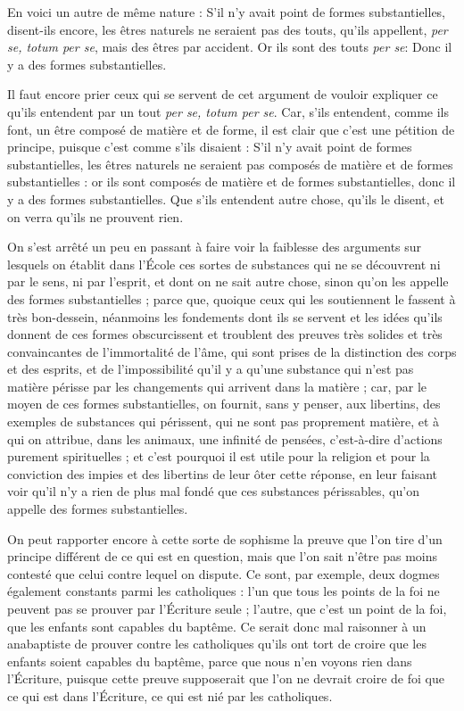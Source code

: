 En voici un autre de même nature : S'il n'y avait point de formes substantielles, disent-ils encore, les êtres naturels ne seraient pas des touts, qu'ils appellent, \emph{per se, totum per se}, mais des êtres par accident. Or ils sont des touts \emph{per se}: Donc il y a des formes substantielles.

Il faut encore prier ceux qui se servent de cet argument de vouloir expliquer ce qu'ils entendent par un tout \emph{per se, totum per se}. Car, s'ils entendent, comme ils font, un être composé de matière et de forme, il est clair que c'est une pétition de principe, puisque c'est comme s'ils disaient : S'il n'y avait point de formes substantielles, les êtres naturels ne seraient pas composés de matière et de formes substantielles : or ils sont composés de matière et de formes substantielles, donc il y a des formes substantielles. Que s'ils entendent autre chose, qu'ils le disent, et on verra qu'ils ne prouvent rien.

On s'est arrêté un peu en passant à faire voir la faiblesse des arguments sur lesquels on établit dans l'École ces sortes de substances qui ne se découvrent ni par le sens, ni par l'esprit, et dont on ne sait autre chose, sinon qu'on les appelle des formes substantielles ; parce que, quoique ceux qui les soutiennent le fassent à très bon-dessein, néanmoins les fondements dont ils se servent et les idées qu'ils donnent de ces formes obscurcissent et troublent des preuves très solides et très convaincantes de l'immortalité de l'âme, qui sont prises de la distinction des corps et des esprits, et de l'impossibilité qu'il y a qu'une substance qui n'est pas matière périsse par les changements qui arrivent dans la matière ; car, par le moyen de ces formes substantielles, on fournit, sans y penser, aux libertins, des exemples de substances qui périssent, qui ne sont pas proprement matière, et à qui on attribue, dans les animaux, une infinité de pensées, c'est-à-dire d'actions purement spirituelles ; et c'est pourquoi il est utile pour la religion et pour la conviction des impies et des libertins de leur ôter cette réponse, en leur faisant voir qu'il n'y a rien de plus mal fondé que ces substances périssables, qu'on appelle des formes substantielles.

On peut rapporter encore à cette sorte de sophisme la preuve que l'on tire d'un principe différent de ce qui est en question, mais que l'on sait n'être pas moins contesté que celui contre lequel on dispute. Ce sont, par exemple, deux dogmes également constants parmi les catholiques : l'un que tous les points de la foi ne peuvent pas se prouver par l'Écriture seule ; l'autre, que c'est un point de la foi, que les enfants sont capables du baptême. Ce serait donc mal raisonner à un anabaptiste de prouver contre les catholiques qu'ils ont tort de croire que les enfants soient capables du baptême, parce que nous n'en voyons rien dans l'Écriture, puisque cette preuve supposerait que l'on ne devrait croire de foi que ce qui est dans l'Écriture, ce qui est nié par les catholiques.

